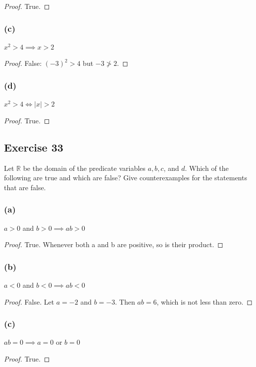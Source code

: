 \documentclass[14pt]{extarticle}
\newcommand{\R}{\mathbb{R}}
\begin{document}
\begin{proof}
True.
\end{proof}

\subsubsection{(c)}
$x^2 > 4 \implies x > 2$

\begin{proof}
False: $(-3)^2 > 4$ but $-3 \ngtr 2$.
\end{proof}

\subsubsection{(d)}
$x^2 > 4 \iff |x| > 2$

\begin{proof}
True.
\end{proof}

\subsection{Exercise 33}
Let $\R$ be the domain of the predicate variables $a, b, c$, and $d$. Which of the following are true and which are false? Give counterexamples for the statements that are false.

\subsubsection{(a)}
$a > 0$ and $b > 0 \implies ab > 0$

\begin{proof}
True. Whenever both a and b are positive, so is their product.
\end{proof}

\subsubsection{(b)}
$a < 0$ and $b < 0 \implies ab < 0$

\begin{proof}
False. Let $a = -2$ and $b = -3$. Then $ab = 6$, which is not less than zero.
\end{proof}

\subsubsection{(c)}
$ab = 0 \implies a = 0$ or $b = 0$

\begin{proof}
True.
\end{proof}
\end{document}
